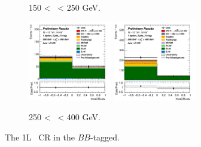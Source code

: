 \begin{figure}[h!]
\begin{subfigure}[b]{\textwidth}
        \caption{150 < \ptv\ < 250 GeV.}
        \label{fig:plots_VHbb_1L_150_CRL}
    \end{subfigure}
    \begin{subfigure}[b]{\textwidth}
        \centering
        \includegraphics[width=0.40\textwidth]{Images/VH/Own_fit/postfit_VHbb/Region_distmvaCRLow_BMax400_BMin250_DCRLow_J2_TTypebb_T2_L1_Y6051_GlobalFit_conditionnal_mu1.png}
        \includegraphics[width=0.40\textwidth]{Images/VH/Own_fit/postfit_VHbb/Region_distmvaCRLow_BMax400_BMin250_DCRLow_J3_TTypebb_T2_L1_Y6051_GlobalFit_conditionnal_mu1.png}
        \caption{250 < \ptv\ < 400 GeV.}
        \label{fig:plots_VHbb_1L_250_CRL}
    \end{subfigure}
    \caption{The 1L \lowdr\ CR in the $BB$-tagged.}
    \label{fig:plots_VHbb_1L_CRL}
\end{figure} 

\vspace*{\fill} \clearpage
\vspace*{\fill}

